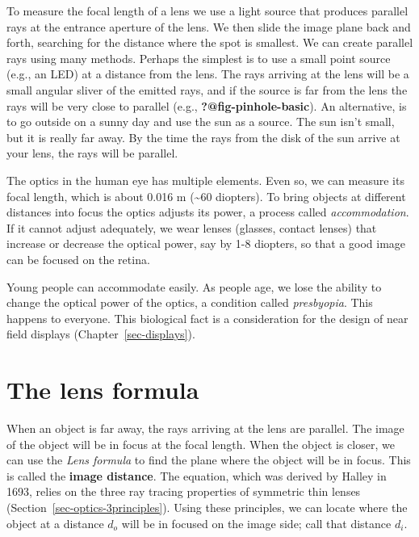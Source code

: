 \documentclass[
  letterpaper,
]{book}
\begin{document}
To measure the focal length of a lens we use a light source that
produces parallel rays at the entrance aperture of the lens. We then
slide the image plane back and forth, searching for the distance where
the spot is smallest. We can create parallel rays using many methods.
Perhaps the simplest is to use a small point source (e.g., an LED) at a
distance from the lens. The rays arriving at the lens will be a small
angular sliver of the emitted rays, and if the source is far from the
lens the rays will be very close to parallel (e.g.,
\textbf{?@fig-pinhole-basic}). An alternative, is to go outside on a
sunny day and use the sun as a source. The sun isn't small, but it is
really far away. By the time the rays from the disk of the sun arrive at
your lens, the rays will be parallel.

The optics in the human eye has multiple elements. Even so, we can
measure its focal length, which is about 0.016 m (\textasciitilde60
diopters). To bring objects at different distances into focus the optics
adjusts its power, a process called \emph{accommodation}. If it cannot
adjust adequately, we wear lenses (glasses, contact lenses) that
increase or decrease the optical power, say by 1-8 diopters, so that a
good image can be focused on the retina.

Young people can accommodate easily. As people age, we lose the ability
to change the optical power of the optics, a condition called
\emph{presbyopia}. This happens to everyone. This biological fact is a
consideration for the design of near field displays
(Chapter~\ref{sec-displays}).

\section{The lens formula}\label{sec-lens-formula}

When an object is far away, the rays arriving at the lens are parallel.
The image of the object will be in focus at the focal length. When the
object is closer, we can use the \emph{Lens formula} to find the plane
where the object will be in focus. This is called the \textbf{image
distance}. The equation, which was derived by Halley in 1693, relies on
the three ray tracing properties of symmetric thin lenses
(Section~\ref{sec-optics-3principles}). Using these principles, we can
locate where the object at a distance \(d_o\) will be in focused on the
image side; call that distance \(d_i\).
\end{document}
